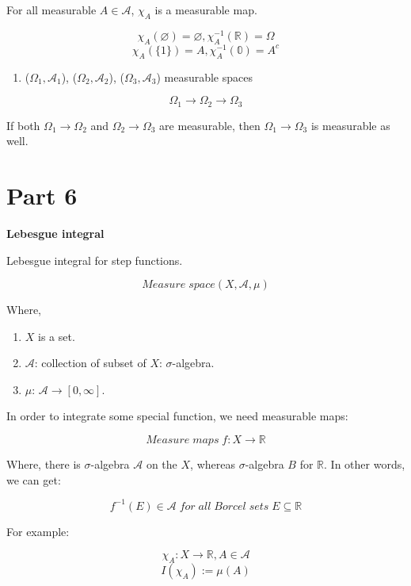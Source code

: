 \documentclass[
]{book}
\providecommand{\tightlist}{%
  \setlength{\itemsep}{0pt}\setlength{\parskip}{0pt}}
\begin{document}
For all measurable \(A \in \mathcal{A}\), \(\chi_A\) is a measurable map.

\[\chi_A(\varnothing)=\varnothing, \chi_A^{-1}(\mathbb{R})=\Omega\]
\[\chi_A(\{ 1 \})=A, \chi_A^{-1}(\mathbb{0})=A^c\]

\begin{enumerate}
\def\labelenumi{(\arabic{enumi})}
\setcounter{enumi}{1}
\tightlist
\item
  (\(\Omega_1,\mathcal{A}_1\)), (\(\Omega_2,\mathcal{A}_2\)), (\(\Omega_3,\mathcal{A}_3\)) measurable spaces
\end{enumerate}

\[\Omega_1 \rightarrow \Omega_2 \rightarrow \Omega_3\]

If both \(\Omega_1 \rightarrow \Omega_2\) and \(\Omega_2 \rightarrow \Omega_3\) are measurable, then \(\Omega_1 \rightarrow \Omega_3\) is measurable as well.

\hypertarget{part-6}{%
\section{Part 6}\label{part-6}}

\textbf{Lebesgue integral}

Lebesgue integral for step functions.

\[Measure \; space(X, \mathcal{A}, \mu)\]

Where,

\begin{enumerate}
\def\labelenumi{(\arabic{enumi})}
\item
  \(X\) is a set.
\item
  \(\mathcal{A}\): collection of subset of \(X\): \(\sigma\)-algebra.
\item
  \(\mu\): \(\mathcal{A} \rightarrow [0, \infty]\).
\end{enumerate}

In order to integrate some special function, we need measurable maps:

\[Measure \; maps \; f: X \rightarrow \mathbb{R}\]

Where, there is \(\sigma\)-algebra \(\mathcal{A}\) on the \(X\), whereas \(\sigma\)-algebra \(B\) for \(\mathbb{R}\). In other words, we can get:

\[f^{-1}(E) \in \mathcal{A} \; for \; all \; Borcel \; sets \; E \subseteq \mathbb{R}\]

For example:

\[\chi_A: X \rightarrow \mathbb{R}, A \in \mathcal{A}\]
\[I(\chi_A):= \mu (A)\]
\end{document}
